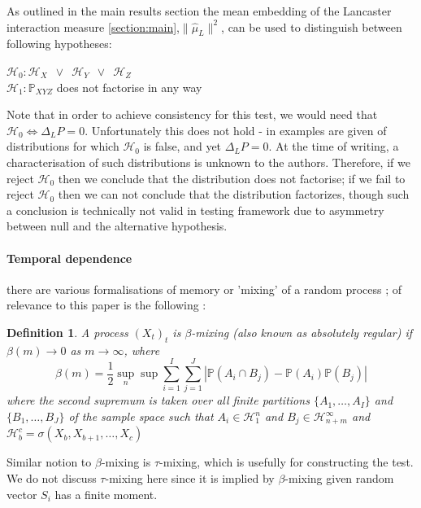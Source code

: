 \documentclass[]{article}
\newtheorem{definition}{Definition}
\begin{document}
As outlined in the main results section the mean embedding of the  Lancaster interaction measure \ref{section:main},$\|\hat \mu_L\|^2$, can be used  to distinguish  between following hypotheses:

$\mathcal{H}_0: \mathcal{H}_X \enspace \lor \enspace \mathcal{H}_Y \enspace \lor \enspace \mathcal{H}_Z $\\
$\mathcal{H}_1: \mathbb{P}_{XYZ}$ does not factorise in any way


Note that in order to achieve consistency for this test, we would need that $\mathcal{H}_0 \iff \Delta_LP = 0$. Unfortunately this does not hold - in \cite{sejdinovic2013kernel} examples are given of distributions for which $\mathcal{H}_0$ is false, and yet $\Delta_LP = 0$. At the time of writing, a characterisation of such distributions is unknown to the authors. Therefore, if we reject $\mathcal{H}_0$ then we conclude that the distribution does not factorise; if we fail to reject $\mathcal{H}_0$ then we can not conclude that the distribution factorizes, though such a conclusion is technically not valid in  testing framework due to asymmetry between null and the alternative hypothesis.   

\paragraph{Temporal dependence}
there are various formalisations of memory or 'mixing' of a random process \cite{doukhan1994mixing,bradley2005basic,dedecker2007weak}; of relevance to this paper is the following :


\begin{definition}
A process $(X_t)_{t}$ is \emph{$\beta$-mixing} (also known as \emph{absolutely regular}) if $\beta(m) \longrightarrow 0$ as $m\longrightarrow \infty$, where
\[ \beta(m) = \frac{1}{2} \sup_n \sup \sum_{i=1}^I \sum_{j=1}^J | \mathbb{P}(A_i \cap B_j) - \mathbb{P}(A_i)\mathbb{P}(B_j)| \]
where the second supremum is taken  over all finite partitions $\{A_1,\ldots, A_I \}$ and  $\{B_1,\ldots, B_J\}$ of the sample space such that $A_i \in \mathcal{H}_1^n$ and $B_j \in \mathcal{H}_{n+m}^\infty$ and $\mathcal{H}_b^c = \sigma(X_b,X_{b+1},\ldots,X_{c})$
\end{definition}
Similar notion to $\beta$-mixing is $\tau$-mixing, which is usefully for constructing the test. We do not discuss $\tau$-mixing here since it is implied by $\beta$-mixing given random vector $S_i$ has a finite moment.   
\end{document}
